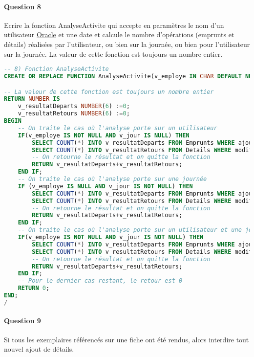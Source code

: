 \documentclass[10pt, oneside]{article}
\begin{document}

\paragraph{Question 8} Ecrire la fonction AnalyseActivite qui accepte en paramètres le nom d'un utilisateur \href{http://www.oracle.com}{Oracle} et une date et calcule le nombre d'opérations (emprunts et détails) réalisées par l'utilisateur, ou bien sur la journée, ou bien pour l'utilisateur sur la journée. La valeur de cette fonction est toujours un nombre entier.

\begin{lstlisting}[language=sql, title=Question 8, label=QVI8]
-- 8) Fonction AnalyseActivite
CREATE OR REPLACE FUNCTION AnalyseActivite(v_employe IN CHAR DEFAULT NULL, v_jour IN DATE DEFAULT NULL) 

-- La valeur de cette fonction est toujours un nombre entier
RETURN NUMBER IS
	v_resultatDeparts NUMBER(6) :=0;
	v_resultatRetours NUMBER(6) :=0;
BEGIN
	-- On traite le cas où l'analyse porte sur un utilisateur
	IF(v_employe IS NOT NULL AND v_jour IS NULL) THEN
		SELECT COUNT(*) INTO v_resultatDeparts FROM Emprunts WHERE ajoutePar=v_employe;
		SELECT COUNT(*) INTO v_resultatRetours FROM Details WHERE modifiePar=v_employe;
		-- On retourne le résultat et on quitte la fonction
		RETURN v_resultatDeparts+v_resultatRetours;
	END IF;
	-- On traite le cas où l'analyse porte sur une journée
	IF (v_employe IS NULL AND v_jour IS NOT NULL) THEN 
		SELECT COUNT(*) INTO v_resultatDeparts FROM Emprunts WHERE ajouteLe=v_jour;
		SELECT COUNT(*) INTO v_resultatRetours FROM Details WHERE modifieLe=v_jour;
		-- On retourne le résultat et on quitte la fonction
		RETURN v_resultatDeparts+v_resultatRetours;	
	END IF;
	-- On traite le cas où l'analyse porte sur un utilisateur et une journée
	IF(v_employe IS NOT NULL AND v_jour IS NOT NULL) THEN
		SELECT COUNT(*) INTO v_resultatDeparts FROM Emprunts WHERE ajoutePar=v_employe AND ajouteLe=v_jour;
		SELECT COUNT(*) INTO v_resultatRetours FROM Details WHERE modifiePar=v_employe AND modifieLe=v_jour;
		-- On retourne le résultat et on quitte la fonction
		RETURN v_resultatDeparts+v_resultatRetours;
	END IF;
	-- Pour le dernier cas restant, le retour est 0
	RETURN 0;
END;
/
\end{lstlisting}


\paragraph{Question 9} Si tous les exemplaires référencés sur une fiche ont été rendus, alors interdire tout nouvel ajout de détails.
\end{document}
